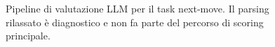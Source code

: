 \begin{figure}[H]
\centering
{}
\caption{Pipeline di valutazione LLM per il task next-move.  Il parsing rilassato è diagnostico e non fa parte del percorso di scoring principale.}
\label{fig:llm-pipeline}
\end{figure}
